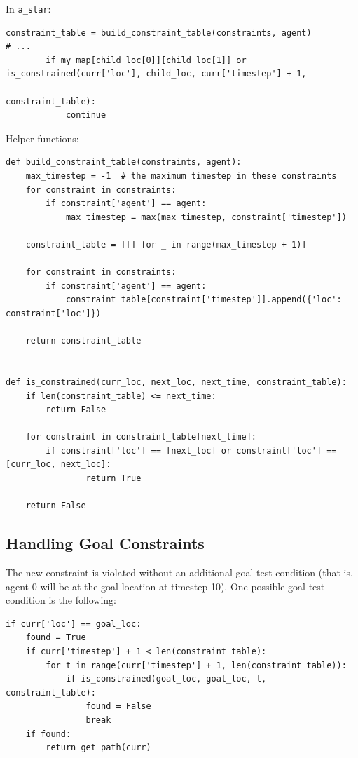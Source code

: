 \documentclass[11pt]{article}
\begin{document}
In \texttt{a\_star}:
\begin{verbatim}
constraint_table = build_constraint_table(constraints, agent)
# ...
        if my_map[child_loc[0]][child_loc[1]] or is_constrained(curr['loc'], child_loc, curr['timestep'] + 1,
                                                              constraint_table):
            continue
\end{verbatim}

Helper functions:

\begin{verbatim}
def build_constraint_table(constraints, agent):
    max_timestep = -1  # the maximum timestep in these constraints
    for constraint in constraints:
        if constraint['agent'] == agent:
            max_timestep = max(max_timestep, constraint['timestep'])

    constraint_table = [[] for _ in range(max_timestep + 1)]

    for constraint in constraints:
        if constraint['agent'] == agent:
            constraint_table[constraint['timestep']].append({'loc': constraint['loc']})

    return constraint_table


def is_constrained(curr_loc, next_loc, next_time, constraint_table):
    if len(constraint_table) <= next_time:
        return False

    for constraint in constraint_table[next_time]:
        if constraint['loc'] == [next_loc] or constraint['loc'] == [curr_loc, next_loc]:
                return True 

    return False
\end{verbatim}


\subsection{Handling Goal Constraints}

The new constraint is violated without an additional goal test condition (that is, agent 0 will be at the goal location at timestep 10). One possible goal test condition is the following:

\begin{verbatim}
if curr['loc'] == goal_loc:
    found = True
    if curr['timestep'] + 1 < len(constraint_table):
        for t in range(curr['timestep'] + 1, len(constraint_table)):
            if is_constrained(goal_loc, goal_loc, t, constraint_table):
                found = False
                break
    if found:
        return get_path(curr)
\end{verbatim}
\end{document}
